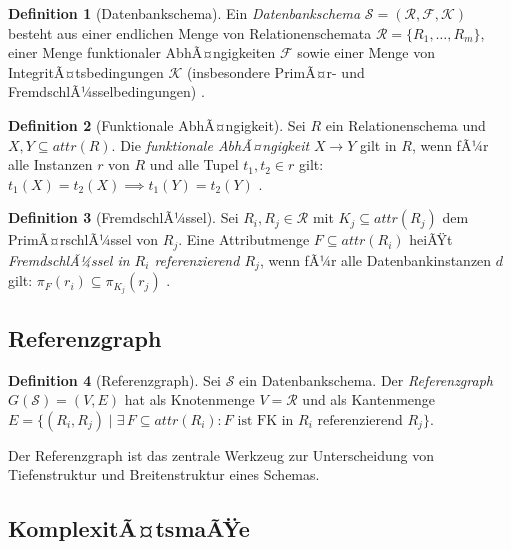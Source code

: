 ﻿\documentclass[12pt,a4paper]{article}
\theoremstyle{definition}
\newtheorem{definition}{Definition}[section]
\theoremstyle{remark}
\newcommand{\att}{\mathit{attr}}
\begin{document}
\begin{definition}[Datenbankschema]
Ein \emph{Datenbankschema} $\mathcal{S} = (\mathcal{R}, \mathcal{F}, \mathcal{K})$
besteht aus einer endlichen Menge von Relationenschemata $\mathcal{R} = \{R_1, \ldots, R_m\}$,
einer Menge funktionaler AbhÃ¤ngigkeiten $\mathcal{F}$ sowie einer Menge von
IntegritÃ¤tsbedingungen $\mathcal{K}$ (insbesondere PrimÃ¤r- und FremdschlÃ¼sselbedingungen)
\cite{Ullman1988}.
\end{definition}

\begin{definition}[Funktionale AbhÃ¤ngigkeit]
Sei $R$ ein Relationenschema und $X, Y \subseteq \att(R)$.
Die \emph{funktionale AbhÃ¤ngigkeit} $X \to Y$ gilt in $R$, wenn fÃ¼r alle
Instanzen $r$ von $R$ und alle Tupel $t_1, t_2 \in r$ gilt:
$t_1(X) = t_2(X) \implies t_1(Y) = t_2(Y)$ \cite{Armstrong1974}.
\end{definition}

\begin{definition}[FremdschlÃ¼ssel]
Sei $R_i, R_j \in \mathcal{R}$ mit $K_j \subseteq \att(R_j)$ dem PrimÃ¤rschlÃ¼ssel
von $R_j$. Eine Attributmenge $F \subseteq \att(R_i)$ heiÃŸt
\emph{FremdschlÃ¼ssel in $R_i$ referenzierend $R_j$}, wenn fÃ¼r alle Datenbankinstanzen
$d$ gilt: $\pi_F(r_i) \subseteq \pi_{K_j}(r_j)$ \cite{Date2003}.
\end{definition}

\subsection{Referenzgraph}

\begin{definition}[Referenzgraph]
\label{def:refgraph}
Sei $\mathcal{S}$ ein Datenbankschema. Der \emph{Referenzgraph}
$G(\mathcal{S}) = (V, E)$ hat als Knotenmenge $V = \mathcal{R}$ und als
Kantenmenge $E = \{(R_i, R_j) \mid \exists\, F \subseteq \att(R_i)\colon
F \text{ ist FK in } R_i \text{ referenzierend } R_j\}$.
\end{definition}

Der Referenzgraph ist das zentrale Werkzeug zur Unterscheidung von
Tiefenstruktur und Breitenstruktur eines Schemas.

\subsection{KomplexitÃ¤tsmaÃŸe}
\end{document}
